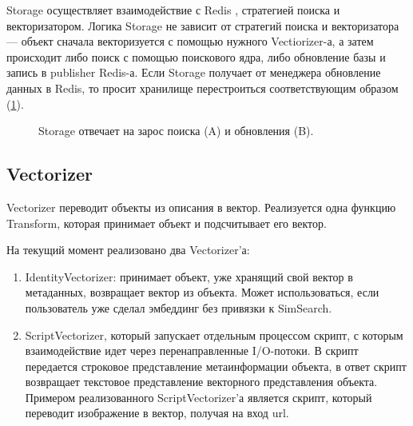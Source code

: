 \documentclass[a4paper,12pt]{extarticle}
\begin{document}
Storage осуществляет взаимодействие с Redis \cite{redis}, стратегией поиска и векторизатором. Логика Storage не зависит от стратегий поиска и векторизатора --- объект сначала векторизуется с помощью нужного Vectiorizer-а, а затем происходит либо поиск с помощью поискового ядра, либо обновление базы и запись в publisher Redis-а. Если Storage получает от менеджера обновление данных в Redis, то просит хранилище перестроиться соответствующим образом (\cref{ris:storage_logic}).

\begin{center}
\begin{figure}[H]
\caption{Storage отвечает на зарос поиска (A) и обновления (B).}
\label{ris:storage_logic}
\end{figure}
\end{center}


\subsection{Vectorizer}

\label{VECT}

Vectorizer переводит объекты из описания в вектор. Реализуется одна функцию Transform, которая принимает объект и подсчитывает его вектор.

На текущий момент реализовано два Vectorizer'а:

\begin{enumerate}
    \item IdentityVectorizer: принимает объект, уже хранящий свой вектор в метаданных, возвращает вектор из объекта. Может использоваться, если пользователь уже сделал эмбеддинг без привязки к SimSearch.
    \item ScriptVectorizer, который запускает отдельным процессом скрипт, с которым взаимодействие идет через перенаправленные I/O-потоки. В скрипт передается строковое представление метаинформации объекта, в ответ скрипт возвращает текстовое представление векторного представления объекта. Примером реализованного ScriptVectorizer'а является скрипт, который переводит изображение в вектор, получая на вход url.
\end{enumerate}
\end{document}
